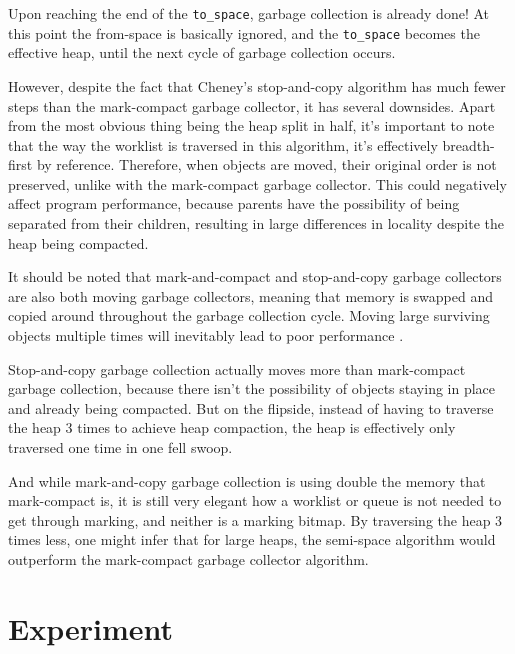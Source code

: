 \documentclass[index]{subfiles}
\begin{document}
Upon reaching the end of the \verb+to_space+, garbage collection is already done! At this point the from-space is basically ignored, and the \verb+to_space+ becomes the effective heap, until the next cycle of garbage collection occurs.

However, despite the fact that Cheney's stop-and-copy algorithm has much fewer steps than the mark-compact garbage collector, it has several downsides. Apart from the most obvious thing being the heap split in half, it's important to note that the way the worklist is traversed in this algorithm, it's effectively breadth-first by reference. Therefore, when objects are moved, their original order is not preserved, unlike with the mark-compact garbage collector. This could negatively affect program performance, because parents have the possibility of being separated from their children, resulting in large differences in locality despite the heap being compacted.

It should be noted that mark-and-compact and stop-and-copy garbage collectors are also both moving garbage collectors, meaning that memory is swapped and copied around throughout the garbage collection cycle. Moving large surviving objects multiple times will inevitably lead to poor performance \cite[Chapter~4]{gc_handbook}.

Stop-and-copy garbage collection actually moves more than mark-compact garbage collection, because there isn't the possibility of objects staying in place and already being compacted. But on the flipside, instead of having to traverse the heap 3 times to achieve heap compaction, the heap is effectively only traversed one time in one fell swoop.

And while mark-and-copy garbage collection is using double the memory that mark-compact is, it is still very elegant how a worklist or queue is not needed to  get through marking, and neither is a marking bitmap. By traversing the heap 3 times less, one might infer that for large heaps, the semi-space algorithm would outperform the mark-compact garbage collector algorithm.

\section{Experiment}

\end{document}
